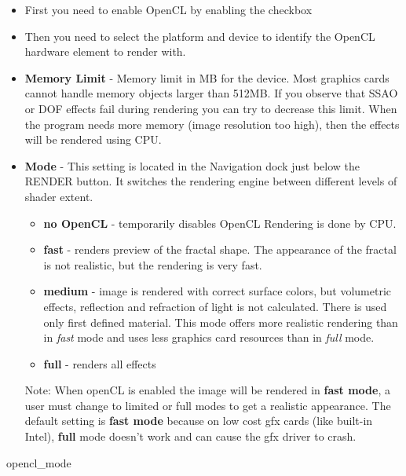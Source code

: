 \begin{itemize}
	\item First you need to enable OpenCL by enabling the checkbox
	\item Then you need to select the platform and device to identify the OpenCL hardware 
		element to render with.
	\item \textbf{Memory Limit} - Memory limit in MB for the device. Most graphics cards cannot handle memory objects larger than 512MB. If you observe that SSAO or DOF effects fail during rendering you can try to decrease this limit. When the program needs more memory (image resolution too high), then the effects will be rendered using CPU.
	\item \textbf{Mode} - This setting is located in the Navigation dock just below the RENDER button. It switches the rendering engine between different levels of shader extent.
	\begin{itemize}
		\item  \textbf{no OpenCL} - temporarily disables OpenCL  Rendering is done by CPU.
		\item  \textbf{fast} - renders preview of the fractal shape. The appearance of the fractal is not realistic, but the rendering is very fast.
		\item  \textbf{medium} - image is rendered with correct surface colors, but volumetric effects, reflection and refraction of light is not calculated. There is used only first defined material. This mode offers more realistic rendering than in \emph{fast} mode and uses less graphics card resources than in \emph{full} mode. 
		\item  \textbf{full} - renders all effects	
	\end{itemize}

Note: When openCL is enabled the image will be rendered in \textbf{fast mode}, a user must change to limited or full modes to get a realistic appearance. The default setting is \textbf{fast mode}  because on low cost gfx cards (like built-in Intel), \textbf{full} mode doesn't work and can cause the gfx driver to crash. 	

	
\end{itemize}
	{opencl_mode}


